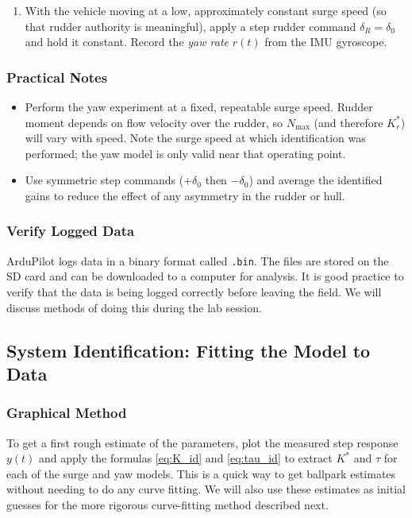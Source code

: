 \documentclass[11pt]{article}
\begin{document}
\begin{enumerate}
  \item With the vehicle moving at a low, approximately constant surge
        speed (so that rudder authority is meaningful), apply a step
        rudder command $\delta_R = \delta_0$ and hold it constant.
        Record the \emph{yaw rate} $r(t)$ from the IMU gyroscope.
\end{enumerate}

\subsubsection{Practical Notes}

\begin{itemize}
  \item Perform the yaw experiment at a fixed, repeatable surge speed.
        Rudder moment depends on flow velocity over the rudder, so
        $N_{\max}$ (and therefore $K_r^*$) will vary with speed.  Note
        the surge speed at which identification was performed; the yaw
        model is only valid near that operating point.
  \item Use symmetric step commands ($+\delta_0$ then $-\delta_0$) and
        average the identified gains to reduce the effect of any
        asymmetry in the rudder or hull.
\end{itemize}

\subsubsection{Verify Logged Data}

ArduPilot logs data in a binary format called \texttt{.bin}.  The files are stored on the SD card and can be downloaded to a computer for analysis.  It is good practice to verify that the data is being logged correctly before leaving the field.  We will discuss methods of doing this during the lab session.

\subsection{System Identification: Fitting the Model to Data}


\subsubsection{Graphical Method}

To get a first rough estimate of the parameters, plot the measured step response $y(t)$ and apply the formulas \eqref{eq:K_id} and \eqref{eq:tau_id} to extract $K^*$ and $\tau$ for each of the surge and yaw models. This is a quick way to get ballpark estimates without needing to do any curve fitting.  We will also use these estimates as initial guesses for the more rigorous curve-fitting method described next.
\end{document}
